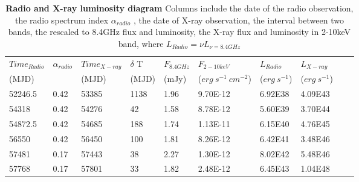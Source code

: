 \begin{table}
\centering
\caption{{\bf Radio and X-ray luminosity diagram} Columns include the date of the radio observation, the radio spectrum index $\alpha_{radio}$ , the date of X-ray observation, the interval between two bands, the rescaled to 8.4GHz flux and luminosity, the X-ray flux and luminosity in 2-10keV band, where $L_{Radio}=\nu {L_{\nu =8.4GHz}}$}
\label{tab:table4}
\begin{tabular}{llllllllll}
\hline
\hline

$Time_{Radio}$ &  $\alpha_{radio}$ & $Time_{X-ray}$ & $\delta$ T & $F_{8.4GHz}$ & $F_{2-10keV}$ & $L_{Radio}$ & $L_{X-ray}$ \\ 
(MJD)  &  & (MJD)  &(MJD)  &(mJy) &($erg~s^{-1}~cm^{-2}$) & ($erg~s^{-1} $)& ($erg~s^{-1} $) \\
\hline

52246.5  & 0.42 & 53385 & 1138 & 1.96 & 9.70E-12 & 6.92E38 & 4.09E43 \\ 
54318 &   0.42 & 54276 & 42 & 1.58 & 8.78E-12 & 5.60E39 & 3.70E44 \\ 
54872.5   & 0.42 & 54685 & 188 & 1.74 & 1.13E-11 & 6.15E40 & 4.76E45 \\ 
56550 &  0.42 & 56450 & 100 & 1.81 & 8.26E-12 & 6.42E41 & 3.48E46 \\ 
57481 &   0.17 & 57443 & 38 & 2.27 & 1.30E-12 & 8.02E42 & 5.48E46 \\ 
57768 &  0.17 & 57801 & 33 & 1.82 & 2.48E-12 & 6.45E43 & 1.04E48 \\ \hline
\end{tabular}
\end{table}